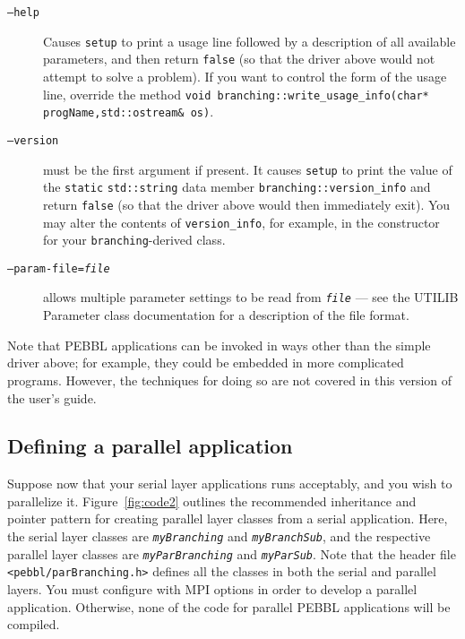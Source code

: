 \begin{description}

\item[\texttt{--help}] Causes \texttt{setup} to print a usage line
followed by a description of all available parameters, and then return
\texttt{false} (so that the driver above would not attempt to solve a
problem).  If you want to control the form of the usage line, override
the method \texttt{void branching::write\_usage\_info(char*
  progName,std::ostream\& os)}.

\item[\texttt{--version}] must be the first argument if present.  It
  causes \texttt{setup} to print the value of the \texttt{static}
  \texttt{std::string} data member \texttt{branching::version\_info} and return
  \texttt{false} (so that the driver above would then immediately
  exit).  You may alter the contents of \texttt{version\_info}, for
  example, in the constructor for your \texttt{branching}-derived
  class.

\item[\texttt{--param-file=\emph{file}}] allows multiple parameter
  settings to be read from \texttt{\emph{file}} --- see the UTILIB
  Parameter class documentation for a description of the file format.

\end{description}

Note that PEBBL applications can be invoked in ways other than the
simple driver above; for example, they could be embedded in more
complicated programs.  However, the techniques for doing so are
not covered in this version of the user's guide.


\subsection{Defining a parallel application}
\label{sec:parMethods}
Suppose now that your serial layer applications runs acceptably, and
you wish to parallelize it.  Figure~\ref{fig:code2} outlines the
recommended inheritance and pointer pattern for creating parallel
layer classes from a serial application.  Here, the serial layer
classes are \texttt{\emph{myBranching}} and
\texttt{\emph{myBranchSub}}, and the respective parallel layer classes
are \texttt{\emph{myParBranching}} and \texttt{\emph{myParSub}}.  Note
that the header file \texttt{<pebbl/parBranching.h>} defines all the
classes in both the serial and parallel layers.  You must configure
with MPI options in order to develop a parallel application.
Otherwise, none of the code for parallel PEBBL applications will be
compiled.

